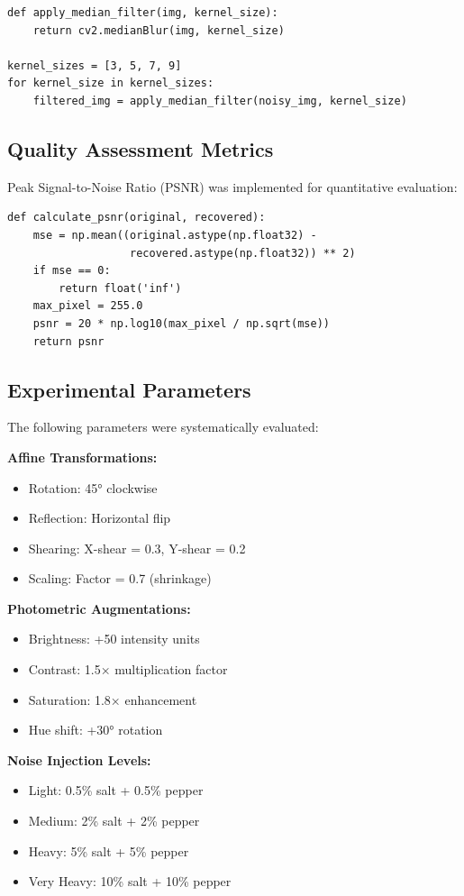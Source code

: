 \documentclass[a4paper, journal]{IEEEtran}
\begin{document}
\begin{lstlisting}[caption=Median Filtering Implementation]
def apply_median_filter(img, kernel_size):
    return cv2.medianBlur(img, kernel_size)

kernel_sizes = [3, 5, 7, 9]
for kernel_size in kernel_sizes:
    filtered_img = apply_median_filter(noisy_img, kernel_size)
\end{lstlisting}

\subsection{Quality Assessment Metrics}
Peak Signal-to-Noise Ratio (PSNR) was implemented for quantitative evaluation:

\begin{lstlisting}[caption=PSNR Calculation]
def calculate_psnr(original, recovered):
    mse = np.mean((original.astype(np.float32) - 
                   recovered.astype(np.float32)) ** 2)
    if mse == 0:
        return float('inf')
    max_pixel = 255.0
    psnr = 20 * np.log10(max_pixel / np.sqrt(mse))
    return psnr
\end{lstlisting}

\subsection{Experimental Parameters}
The following parameters were systematically evaluated:

\textbf{Affine Transformations:}
\begin{itemize}
    \item Rotation: 45° clockwise
    \item Reflection: Horizontal flip
    \item Shearing: X-shear = 0.3, Y-shear = 0.2
    \item Scaling: Factor = 0.7 (shrinkage)
\end{itemize}

\textbf{Photometric Augmentations:}
\begin{itemize}
    \item Brightness: +50 intensity units
    \item Contrast: 1.5× multiplication factor
    \item Saturation: 1.8× enhancement
    \item Hue shift: +30° rotation
\end{itemize}

\textbf{Noise Injection Levels:}
\begin{itemize}
    \item Light: 0.5\% salt + 0.5\% pepper
    \item Medium: 2\% salt + 2\% pepper
    \item Heavy: 5\% salt + 5\% pepper
    \item Very Heavy: 10\% salt + 10\% pepper
\end{itemize}
\end{document}
